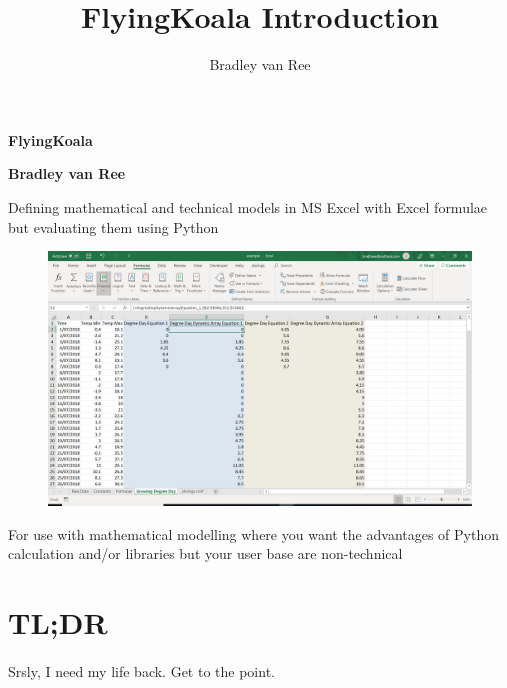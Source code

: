 \documentclass[12pt,a4paper,twoside,openright,titlepage]{article}
\author{Bradley van Ree}
\title{FlyingKoala Introduction}
\begin{document}
\begin{titlepage}
   \begin{center}
       \vspace*{1cm}
 
       \textbf{FlyingKoala}
 
       \vspace{2cm}
 
       \textbf{Bradley van Ree}
 
       \vspace{2cm}
 
       Defining mathematical and technical models in MS Excel with Excel formulae but evaluating them using Python
 
\vfill 
 
		\begin{figure}[h!]
			\centering
			\includegraphics[scale=0.4]{images/degreedaydynamicarray_equation_1.PNG}
		\end{figure}
 
\vfill 
 
       For use with mathematical modelling where you want the advantages of Python calculation and/or libraries but your user base are non-technical
       
       \vfill
 
   \end{center}
\end{titlepage}

\tableofcontents

\newpage 

\section{TL;DR}
\paragraph{} Srsly, I need my life back. Get to the point.
\end{document}
